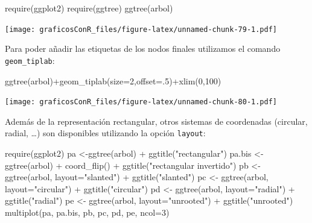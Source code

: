 \documentclass[
]{article}
\newenvironment{Shaded}{\begin{snugshade}}{\end{snugshade}}
\newcommand{\AttributeTok}[1]{\textcolor[rgb]{0.77,0.63,0.00}{#1}}
\newcommand{\DecValTok}[1]{\textcolor[rgb]{0.00,0.00,0.81}{#1}}
\newcommand{\FunctionTok}[1]{\textcolor[rgb]{0.00,0.00,0.00}{#1}}
\newcommand{\NormalTok}[1]{#1}
\newcommand{\OtherTok}[1]{\textcolor[rgb]{0.56,0.35,0.01}{#1}}
\newcommand{\SpecialCharTok}[1]{\textcolor[rgb]{0.00,0.00,0.00}{#1}}
\newcommand{\StringTok}[1]{\textcolor[rgb]{0.31,0.60,0.02}{#1}}
\numberwithin{ejcnt}{section}
\begin{document}
\begin{Shaded}
\begin{Highlighting}[]
\FunctionTok{require}\NormalTok{(ggplot2)}
\FunctionTok{require}\NormalTok{(ggtree)}
\FunctionTok{ggtree}\NormalTok{(arbol)}
\end{Highlighting}
\end{Shaded}

\texttt{[image: graficosConR\_files/figure-latex/unnamed-chunk-79-1.pdf]}

Para poder añadir las etiquetas de los nodos finales utilizamos el comando \texttt{geom\_tiplab}:

\begin{Shaded}
\begin{Highlighting}[]
\FunctionTok{ggtree}\NormalTok{(arbol)}\SpecialCharTok{+}\FunctionTok{geom\_tiplab}\NormalTok{(}\AttributeTok{size=}\DecValTok{2}\NormalTok{,}\AttributeTok{offset=}\NormalTok{.}\DecValTok{5}\NormalTok{)}\SpecialCharTok{+}\FunctionTok{xlim}\NormalTok{(}\DecValTok{0}\NormalTok{,}\DecValTok{100}\NormalTok{)}
\end{Highlighting}
\end{Shaded}

\texttt{[image: graficosConR\_files/figure-latex/unnamed-chunk-80-1.pdf]}

Además de la representación rectangular, otros sistemas de coordenadas (circular, radial, \ldots) son disponibles utilizando la opción \texttt{layout}:

\begin{Shaded}
\begin{Highlighting}[]
\FunctionTok{require}\NormalTok{(ggplot2)}
\NormalTok{pa }\OtherTok{\textless{}{-}}\FunctionTok{ggtree}\NormalTok{(arbol) }\SpecialCharTok{+} \FunctionTok{ggtitle}\NormalTok{(}\StringTok{"rectangular"}\NormalTok{)}
\NormalTok{pa.bis }\OtherTok{\textless{}{-}} \FunctionTok{ggtree}\NormalTok{(arbol) }\SpecialCharTok{+} \FunctionTok{coord\_flip}\NormalTok{() }\SpecialCharTok{+} \FunctionTok{ggtitle}\NormalTok{(}\StringTok{"rectangular invertido"}\NormalTok{)}
\NormalTok{pb }\OtherTok{\textless{}{-}} \FunctionTok{ggtree}\NormalTok{(arbol, }\AttributeTok{layout=}\StringTok{"slanted"}\NormalTok{) }\SpecialCharTok{+} \FunctionTok{ggtitle}\NormalTok{(}\StringTok{"slanted"}\NormalTok{)}
\NormalTok{pc }\OtherTok{\textless{}{-}} \FunctionTok{ggtree}\NormalTok{(arbol, }\AttributeTok{layout=}\StringTok{"circular"}\NormalTok{) }\SpecialCharTok{+} \FunctionTok{ggtitle}\NormalTok{(}\StringTok{"circular"}\NormalTok{)}
\NormalTok{pd }\OtherTok{\textless{}{-}} \FunctionTok{ggtree}\NormalTok{(arbol, }\AttributeTok{layout=}\StringTok{"radial"}\NormalTok{) }\SpecialCharTok{+} \FunctionTok{ggtitle}\NormalTok{(}\StringTok{"radial"}\NormalTok{)}
\NormalTok{pe }\OtherTok{\textless{}{-}} \FunctionTok{ggtree}\NormalTok{(arbol, }\AttributeTok{layout=}\StringTok{"unrooted"}\NormalTok{) }\SpecialCharTok{+} \FunctionTok{ggtitle}\NormalTok{(}\StringTok{"unrooted"}\NormalTok{)}
\FunctionTok{multiplot}\NormalTok{(pa, pa.bis, pb, pc, pd, pe, }\AttributeTok{ncol=}\DecValTok{3}\NormalTok{)}
\end{Highlighting}
\end{Shaded}
\end{document}
